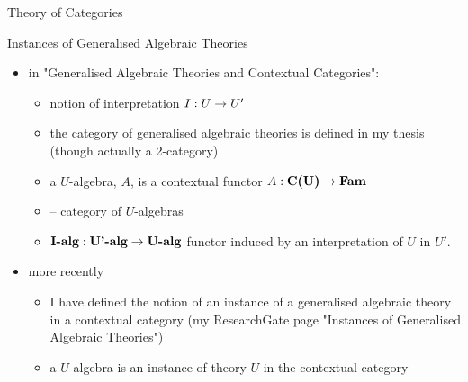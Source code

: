 \begin{frame}{Theory of Categories}
\footnotesize

\end{frame}

\begin{frame}{Instances of Generalised Algebraic Theories}
\begin{itemize}
\item in "Generalised Algebraic Theories and Contextual Categories":
\begin{itemize}
  \item notion of interpretation $I: U \rightarrow U'$ 
  \item the  category of  generalised algebraic theories 
      is defined in my thesis (though actually a 2-category)
  \item  a $U$-algebra, $A$, is a contextual functor $A: \textbf{C(U)} \rightarrow \textbf{Fam}$
  \item {} -- category of $U$-algebras
  \item $\textbf{I-alg}: \textbf{U'-alg} \rightarrow \textbf{U-alg}$ functor induced by an interpretation of $U$ in $U'$.
\end{itemize}
\item more recently 
\begin{itemize}
    \item I have defined the notion of an instance of a generalised algebraic theory in a contextual category
         (my ResearchGate page "Instances of Generalised Algebraic Theories")
    \item a $U$-algebra is an instance of theory $U$ in the contextual category 
\end{itemize}
\end{itemize}
\end{frame}


\newcommand{\USigmaA}{U_{\SigmaA}}
\newcommand{\USigmaAalg}{\USigmaA\mhyphen alg}
\newcommand{\SigmaA}{\Sigma A}

